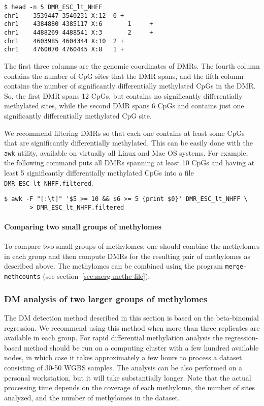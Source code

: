 \documentclass[10pt]{article}
\begin{document}
{\small{%
\begin{verbatim}
$ head -n 5 DMR_ESC_lt_NHFF
chr1    3539447 3540231 X:12  0 +
chr1    4384880 4385117 X:6       1     +
chr1    4488269 4488541 X:3       2     +
chr1    4603985 4604344 X:10  2 +
chr1    4760070 4760445 X:8   1 +
\end{verbatim}%
}}

The first three columns are the genomic coordinates of DMRs. The fourth
column contains the number of CpG sites that the DMR spans, and the fifth
column contains the number of significantly differentially methylated
CpGs in the DMR. So, the first DMR spans 12 CpGs, but contains no
significantly differentially methylated sites, while the second DMR spans
6 CpGs and contains just one significantly differentially methylated CpG
site.

We recommend filtering DMRs so that each one contains at least some
CpGs that are significantly differentially methylated. This can be easily
done with the {\tt awk} utility, available on virtually all Linux and Mac OS
systems. For example, the following command puts all DMRs spanning
at least 10 CpGs and having at least 5 significantly differentially
methylated CpGs into a file {\tt DMR\_ESC\_lt\_NHFF.filtered}.
{\small{%
\begin{verbatim}
$ awk -F "[:\t]" '$5 >= 10 && $6 >= 5 {print $0}' DMR_ESC_lt_NHFF \
       > DMR_ESC_lt_NHFF.filtered
\end{verbatim}%
}}

\paragraph{Comparing two small groups of methylomes} To compare two small
groups of methylomes, one should combine the methylomes in each group and
then compute DMRs for the resulting pair of methylomes as described above.
The methylomes can be combined using the program {\tt merge-methcounts}
(see section~\ref{sec:merg-methc-file}).

\subsubsection{DM analysis of two larger groups of methylomes}

The DM detection method described in this section is based on the beta-binomial
regression. We recommend using this method when more than three replicates
are available in each group. For rapid differential methylation analysis the
regression-based method should be run on a computing cluster with a few
hundred available nodes, in which case it takes approximately a few hours to
process a dataset consisting of 30-50 WGBS samples. The analysis can be also
performed on a personal workstation, but it will take substantially longer. Note
that the actual processing time depends on the coverage of each methylome, the
number of sites analyzed, and the number of methylomes in the dataset.
\end{document}
